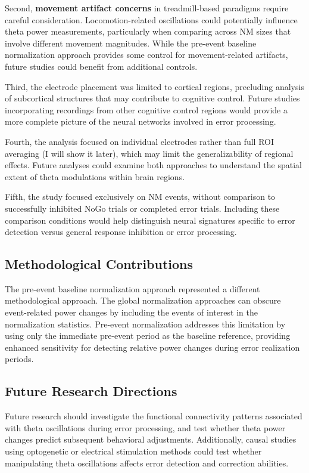 \documentclass[11pt]{article}
\begin{document}
Second, \textbf{movement artifact concerns} in treadmill-based paradigms require careful consideration. Locomotion-related oscillations could potentially influence theta power measurements, particularly when comparing across NM sizes that involve different movement magnitudes. While the pre-event baseline normalization approach provides some control for movement-related artifacts, future studies could benefit from additional controls.

Third, the electrode placement was limited to cortical regions, precluding analysis of subcortical structures that may contribute to cognitive control. Future studies incorporating recordings from other cognitive control regions would provide a more complete picture of the neural networks involved in error processing.

Fourth, the analysis focused on individual electrodes rather than full ROI averaging (I will show it later), which may limit the generalizability of regional effects. Future analyses could examine both approaches to understand the spatial extent of theta modulations within brain regions.

Fifth, the study focused exclusively on NM events, without comparison to successfully inhibited NoGo trials or completed error trials. Including these comparison conditions would help distinguish neural signatures specific to error detection versus general response inhibition or error processing.

\subsection{Methodological Contributions}

The pre-event baseline normalization approach represented a different methodological approach. The global normalization approaches can obscure event-related power changes by including the events of interest in the normalization statistics. Pre-event normalization addresses this limitation by using only the immediate pre-event period as the baseline reference, providing enhanced sensitivity for detecting relative power changes during error realization periods.

\subsection{Future Research Directions}

Future research should investigate the functional connectivity patterns associated with theta oscillations during error processing, and test whether theta power changes predict subsequent behavioral adjustments. Additionally, causal studies using optogenetic or electrical stimulation methods could test whether manipulating theta oscillations affects error detection and correction abilities.
\end{document}
